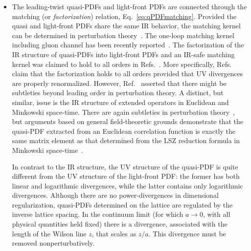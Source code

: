 \begin{itemize}
\item The leading-twist quasi-PDFs and light-front PDFs are connected through 
the matching (or {\it factorization}) relation, Eq.~\eqref{eq:qPDFmatching}. 
%
Provided the quasi and light-front PDFs share the same IR behavior, the 
matching kernel can be determined in perturbation theory~\cite{Xiong:2013bka}. 
%
The one-loop matching kernel including gluon channel has been recently 
reported~\cite{Wang:2017qyg}.
%
The factorization of the IR structure of quasi-PDFs into light-front PDFs and an IR-safe matching kernel was claimed to hold to all orders in Refs.~\cite{Ma:2014jla,Ma:2014jga,Ma:2017pxb}.
%
More specifically, Refs.~\cite{Ma:2014jla,Ma:2014jga} claim that the 
factorization holds to all orders provided that UV divergences 
are properly renormalized.
%
However, Ref.~\cite{Li:2016amo} asserted that there might be subtleties beyond 
leading order in perturbation theory. 
%
A distinct, but similar, issue is the IR structure of extended operators in 
Euclidean and Minkowski space-time. 
%
There are again subtleties in perturbation theory~\cite{Carlson:2017gpk}, 
but arguments based on general field-theoretic grounds demonstrate that the 
quasi-PDF extracted from an Euclidean correlation function is exactly the 
same matrix element as that determined from the LSZ reduction formula in 
Minkowski space-time~\cite{Briceno:2017cpo}.

In contrast to the IR structure, the UV structure of the quasi-PDF is quite 
different from the UV structure of the light-front PDF: the former has both 
linear and logarithmic divergences, while the latter contains only logarithmic 
divergences. 
%
Although there are no power-divergences in dimensional regularization, 
quasi-PDFs determined on the lattice are regulated by the inverse lattice 
spacing. 
%
In the continuum limit (for which $a\to 0$, with all physical quantities held 
fixed) there is a divergence, associated with the length of the Wilson line $z$, 
that scales as $z/a$. This divergence must be removed nonperturbatively.


\end{itemize}
